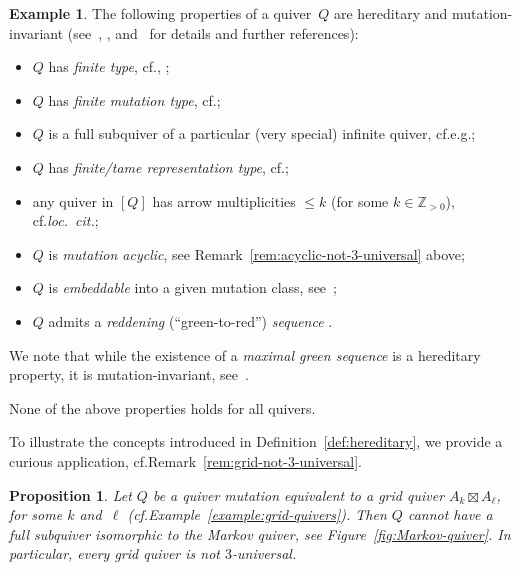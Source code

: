 \documentclass[10pt]{amsart}
\newtheorem{proposition}[theorem]{Proposition}
\theoremstyle{definition}
\newtheorem{example}[theorem]{Example}
\newcommand{\cf}{cf.}
\newcommand{\eg}{e.g.}
\newcommand{\ZZ}{{\mathbb{Z}}}
\begin{document}
\begin{example}
The following properties of a quiver~$Q$ are hereditary and mutation-invariant (see~\cite[Section~4.1]{FWZ}, \cite[Section~5.2]{keller-survey}, and~\cite[Section~3]{muller-max-green} for details and further references): 
\begin{itemize}%
\item 
$Q$ has \emph{finite type}, \cf \cite{ca2}, \cite[Remark~5.10.9]{FWZ}; %
\item 
$Q$ has \emph{finite mutation type}, \cf \cite[Proposition~4.1.4]{FWZ}; 
\item
$Q$ is a full subquiver of a particular (very special) infinite quiver, \cf \eg \cite{Henrich}; 
\item 
$Q$ has \emph{finite/tame representation type}, \cf \cite[Theorem~5.5]{keller-survey}; 
\item
any quiver in $[Q]$ has arrow multiplicities $\le k$ (for some $k\in\ZZ_{>0}$), \cf \emph{loc.\ cit.}; 
\item 
$Q$ is \emph{mutation acyclic}, see Remark~\ref{rem:acyclic-not-3-universal} above; 
\item
$Q$ is \emph{embeddable} into a given mutation class, see~\cite[Definition~4.1.8]{FWZ}; %
\item 
$Q$ admits a \emph{reddening} (``green-to-red'') \emph{sequence} 
\cite[Theorem~17, Corollary~19]{muller-max-green}. 
\end{itemize}
We note that while the existence of a \emph{maximal green sequence} is a hereditary property, it is  mutation-invariant, see~\cite[Theorem~9, Corollary~14]{muller-max-green}. 

None of the above properties holds for all quivers. 
\end{example}

To illustrate the concepts introduced in Definition~\ref{def:hereditary}, 
we provide a curious application, \cf Remark~\ref{rem:grid-not-3-universal}. 

\begin{proposition}
\label{prop:grid-no-markov}
Let $Q$ be a quiver mutation equivalent to a grid quiver $A_k\boxtimes A_\ell$, for some $k$ and~$\ell$ (\cf Example~\ref{example:grid-quivers}). Then $Q$ cannot have a full subquiver isomorphic to the Markov quiver, see Figure~\ref{fig:Markov-quiver}. In particular, every grid quiver is not $3$-universal. 
\end{proposition}
\end{document}
